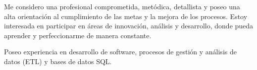 %
%
%
\par{
Me considero una profesional comprometida, metódica, detallista y poseo una alta orientación al cumplimiento de las metas y la mejora de los procesos. Estoy interesada en participar en áreas de innovación, análisis y desarrollo, donde pueda aprender y perfeccionarme de manera constante.}
\par{
Poseo experiencia en desarrollo de software, procesos de gestión y análisis de datos (ETL) y bases de datos SQL.
}